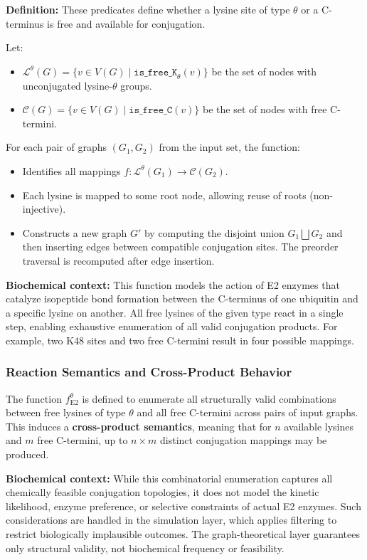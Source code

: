 \documentclass[12pt]{article}
\begin{document}
\textbf{Definition:} These predicates define whether a lysine site of type \( \theta \) or a C-terminus is free and available for conjugation.

Let:
\begin{itemize}
    \item $\mathcal{L}^\theta(G) = \{v \in V(G) \mid \texttt{is\_free\_K}_\theta(v)\}$ be the set of nodes with unconjugated lysine-$\theta$ groups.
    \item $\mathcal{C}(G) = \{v \in V(G) \mid \texttt{is\_free\_C}(v)\}$ be the set of nodes with free C-termini.
\end{itemize}

For each pair of graphs $(G_1, G_2)$ from the input set, the function:
\begin{itemize}
    \item Identifies all mappings $f: \mathcal{L}^\theta(G_1) \to \mathcal{C}(G_2)$.
    \item Each lysine is mapped to some root node, allowing reuse of roots (non-injective).
    \item Constructs a new graph \( G' \) by computing the disjoint union \( G_1 \bigsqcup G_2 \) and then inserting edges between compatible conjugation sites. The preorder traversal is recomputed after edge insertion.
\end{itemize}

\textbf{Biochemical context:} This function models the action of E2 enzymes that catalyze isopeptide bond formation between the C-terminus of one ubiquitin and a specific lysine on another. All free lysines of the given type react in a single step, enabling exhaustive enumeration of all valid conjugation products. For example, two K48 sites and two free C-termini result in four possible mappings.

\subsubsection*{Reaction Semantics and Cross-Product Behavior}

The function \( f^\theta_{\text{E2}} \) is defined to enumerate all structurally valid combinations between free lysines of type \( \theta \) and all free C-termini across pairs of input graphs. This induces a \textbf{cross-product semantics}, meaning that for \( n \) available lysines and \( m \) free C-termini, up to \( n \times m \) distinct conjugation mappings may be produced.

\vspace{0.5em}
\textbf{Biochemical context:} While this combinatorial enumeration captures all chemically feasible conjugation topologies, it does not model the kinetic likelihood, enzyme preference, or selective constraints of actual E2 enzymes. Such considerations are handled in the simulation layer, which applies filtering to restrict biologically implausible outcomes. The graph-theoretical layer guarantees only structural validity, not biochemical frequency or feasibility.
\end{document}
